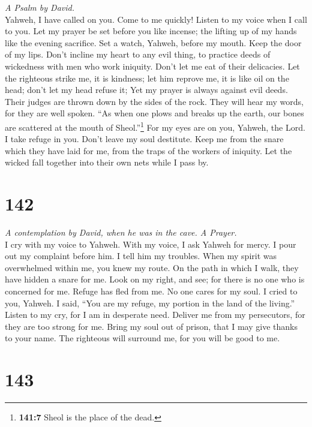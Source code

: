 \emph{A Psalm by David.}\\
 Yahweh, I have called on you. Come to me quickly! Listen
to my voice when I call to you.  Let my prayer be set
before you like incense; the lifting up of my hands like the evening
sacrifice.  Set a watch, Yahweh, before my mouth. Keep the
door of my lips.  Don't incline my heart to any evil
thing, to practice deeds of wickedness with men who work iniquity. Don't
let me eat of their delicacies.  Let the righteous strike
me, it is kindness; let him reprove me, it is like oil on the head;
don't let my head refuse it; Yet my prayer is always against evil deeds.
 Their judges are thrown down by the sides of the rock.
They will hear my words, for they are well spoken.  ``As
when one plows and breaks up the earth, our bones are scattered at the
mouth of Sheol.''\footnote{\textbf{141:7} Sheol is the place of the
  dead.}  For my eyes are on you, Yahweh, the Lord. I take
refuge in you. Don't leave my soul destitute.  Keep me
from the snare which they have laid for me, from the traps of the
workers of iniquity.  Let the wicked fall together into
their own nets while I pass by.

\hypertarget{section-141}{%
\section{142}\label{section-141}}

\emph{A contemplation by David, when he was in the cave. A Prayer.}\\
 I cry with my voice to Yahweh. With my voice, I ask
Yahweh for mercy.  I pour out my complaint before him. I
tell him my troubles.  When my spirit was overwhelmed
within me, you knew my route. On the path in which I walk, they have
hidden a snare for me.  Look on my right, and see; for
there is no one who is concerned for me. Refuge has fled from me. No one
cares for my soul.  I cried to you, Yahweh. I said, ``You
are my refuge, my portion in the land of the living.'' 
Listen to my cry, for I am in desperate need. Deliver me from my
persecutors, for they are too strong for me.  Bring my
soul out of prison, that I may give thanks to your name. The righteous
will surround me, for you will be good to me.

\hypertarget{section-142}{%
\section{143}\label{section-142}}

